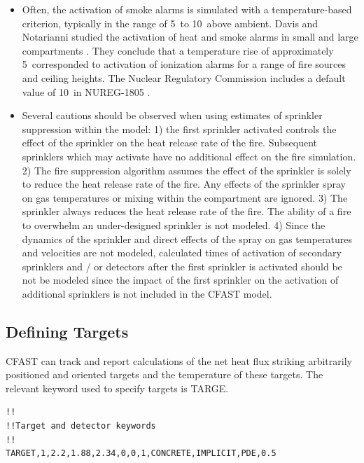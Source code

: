 \begin{itemize}
\item Often, the activation of smoke alarms is simulated with a temperature-based criterion, typically in the range of 5~\degc to 10~\degc above ambient. Davis and Notarianni  studied the activation of heat and smoke alarms in small and large compartments \cite{Davis:1996}. They conclude that a temperature rise of approximately 5~\degc corresponded to activation of ionization alarms for a range of fire sources and ceiling heights. The Nuclear Regulatory Commission includes a default value of 10~\degc in NUREG-1805 \cite{NRCNUREG1805} .
\item Several cautions should be observed when using estimates of sprinkler suppression within the model: 1) the first sprinkler activated controls the effect of the sprinkler on the heat release rate of the fire.  Subsequent sprinklers which may activate have no additional effect on the fire simulation. 2) The fire suppression algorithm assumes the effect of the sprinkler is solely to reduce the heat release rate of the fire. Any effects of the sprinkler spray on gas temperatures or mixing within the compartment are ignored. 3) The sprinkler always reduces the heat release rate of the fire. The ability of a fire to overwhelm an under-designed sprinkler is not modeled. 4) Since the dynamics of the sprinkler and direct effects of the spray on gas temperatures and velocities are not modeled, calculated times of activation of secondary sprinklers and / or detectors after the first sprinkler is activated should be not be modeled since the impact of the first sprinkler on the activation of additional sprinklers is not included in the CFAST model.
\end{itemize}

\subsection{Defining Targets}

CFAST can track and report calculations of the net heat flux striking arbitrarily positioned and oriented targets and the temperature of these targets.  The relevant keyword used to specify targets is TARGE. 

\newpage

\begin{lstlisting}
!!
!!Target and detector keywords
!!
TARGET,1,2.2,1.88,2.34,0,0,1,CONCRETE,IMPLICIT,PDE,0.5
\end{lstlisting}


